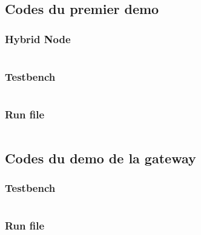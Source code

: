 \subsection{Codes du premier demo}

\subsubsection{Hybrid Node}
\label{anexe:first_demo:hybrid_node}
\inputminted[autogobble]{python}{anexes/first_demo/hybrid_node.py}

\subsubsection{Testbench}
\label{anexe:first_demo:testbench}
\inputminted[autogobble]{python}{anexes/first_demo/testbench.py}

\subsubsection{Run file}
\label{anexe:first_demo:run_file}
\inputminted[autogobble]{python}{anexes/first_demo/run_microsar.py}


\subsection{Codes du demo de la gateway}

\subsubsection{Testbench}
\label{anexe:gw_demo:testbench}
\inputminted[autogobble]{python}{anexes/Gw_demo/testbench.py}

\subsubsection{Run file}
\label{anexe:gw_demo:run_file}
\inputminted[autogobble]{python}{anexes/Gw_demo/run_microsar.py}